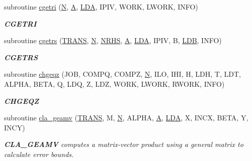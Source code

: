 \begin{DoxyCompactItemize}
subroutine \hyperlink{group__complexGEcomputational_gae22ce12a3734b080ad8369ebf7e9c3a7}{cgetri} (\hyperlink{polmisc_8c_a0240ac851181b84ac374872dc5434ee4}{N}, \hyperlink{classA}{A}, \hyperlink{example__user_8c_ae946da542ce0db94dced19b2ecefd1aa}{L\+D\+A}, I\+P\+I\+V, W\+O\+R\+K, L\+W\+O\+R\+K, I\+N\+F\+O)
\begin{DoxyCompactList}\small\item\em {\bfseries C\+G\+E\+T\+R\+I} \end{DoxyCompactList}\item 
subroutine \hyperlink{group__complexGEcomputational_ga3a79ef0038488e420519c422c1a2a8f2}{cgetrs} (\hyperlink{superlu__enum__consts_8h_a0c4e17b2d5cea33f9991ccc6a6678d62a1f61e3015bfe0f0c2c3fda4c5a0cdf58}{T\+R\+A\+N\+S}, \hyperlink{polmisc_8c_a0240ac851181b84ac374872dc5434ee4}{N}, \hyperlink{example__user_8c_aa0138da002ce2a90360df2f521eb3198}{N\+R\+H\+S}, \hyperlink{classA}{A}, \hyperlink{example__user_8c_ae946da542ce0db94dced19b2ecefd1aa}{L\+D\+A}, I\+P\+I\+V, B, \hyperlink{example__user_8c_a50e90a7104df172b5a89a06c47fcca04}{L\+D\+B}, I\+N\+F\+O)
\begin{DoxyCompactList}\small\item\em {\bfseries C\+G\+E\+T\+R\+S} \end{DoxyCompactList}\item 
subroutine \hyperlink{group__complexGEcomputational_ga2c07ec6e7b75b527987e381674bdd68b}{chgeqz} (J\+O\+B, C\+O\+M\+P\+Q, C\+O\+M\+P\+Z, \hyperlink{polmisc_8c_a0240ac851181b84ac374872dc5434ee4}{N}, I\+L\+O, I\+H\+I, H, L\+D\+H, T, L\+D\+T, A\+L\+P\+H\+A, B\+E\+T\+A, Q, L\+D\+Q, Z, L\+D\+Z, W\+O\+R\+K, L\+W\+O\+R\+K, R\+W\+O\+R\+K, I\+N\+F\+O)
\begin{DoxyCompactList}\small\item\em {\bfseries C\+H\+G\+E\+Q\+Z} \end{DoxyCompactList}\item 
subroutine \hyperlink{group__complexGEcomputational_gadf6f5ebfc2914a4e1ee2fd4cfa684f28}{cla\+\_\+geamv} (\hyperlink{superlu__enum__consts_8h_a0c4e17b2d5cea33f9991ccc6a6678d62a1f61e3015bfe0f0c2c3fda4c5a0cdf58}{T\+R\+A\+N\+S}, M, \hyperlink{polmisc_8c_a0240ac851181b84ac374872dc5434ee4}{N}, A\+L\+P\+H\+A, \hyperlink{classA}{A}, \hyperlink{example__user_8c_ae946da542ce0db94dced19b2ecefd1aa}{L\+D\+A}, X, I\+N\+C\+X, B\+E\+T\+A, Y, I\+N\+C\+Y)
\begin{DoxyCompactList}\small\item\em {\bfseries C\+L\+A\+\_\+\+G\+E\+A\+M\+V} computes a matrix-\/vector product using a general matrix to calculate error bounds. \end{DoxyCompactList}\item 

\end{DoxyCompactItemize}
